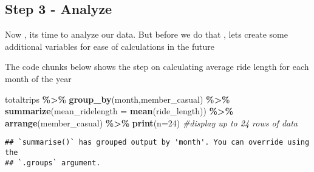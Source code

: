 \documentclass[
]{article}
\newenvironment{Shaded}{\begin{snugshade}}{\end{snugshade}}
\newcommand{\AttributeTok}[1]{\textcolor[rgb]{0.13,0.29,0.53}{#1}}
\newcommand{\CommentTok}[1]{\textcolor[rgb]{0.56,0.35,0.01}{\textit{#1}}}
\newcommand{\DecValTok}[1]{\textcolor[rgb]{0.00,0.00,0.81}{#1}}
\newcommand{\FunctionTok}[1]{\textcolor[rgb]{0.13,0.29,0.53}{\textbf{#1}}}
\newcommand{\NormalTok}[1]{#1}
\newcommand{\OtherTok}[1]{\textcolor[rgb]{0.56,0.35,0.01}{#1}}
\newcommand{\SpecialCharTok}[1]{\textcolor[rgb]{0.81,0.36,0.00}{\textbf{#1}}}
\begin{document}
\subsection{Step 3 - Analyze}\label{step-3---analyze}

Now , its time to analyze our data. But before we do that , lets create
some additional variables for ease of calculations in the future

\begin{Shaded}
\end{Shaded}

The code chunks below shows the step on calculating average ride length
for each month of the year

\begin{Shaded}
\begin{Highlighting}[]
\NormalTok{totaltrips }\SpecialCharTok{\%\textgreater{}\%} \FunctionTok{group\_by}\NormalTok{(month,member\_casual) }\SpecialCharTok{\%\textgreater{}\%} \FunctionTok{summarize}\NormalTok{(}\AttributeTok{mean\_ridelength =} \FunctionTok{mean}\NormalTok{(ride\_length)) }\SpecialCharTok{\%\textgreater{}\%} \FunctionTok{arrange}\NormalTok{(member\_casual) }\SpecialCharTok{\%\textgreater{}\%} \FunctionTok{print}\NormalTok{(}\AttributeTok{n=}\DecValTok{24}\NormalTok{) }\CommentTok{\#display up to 24 rows of data}
\end{Highlighting}
\end{Shaded}

\begin{verbatim}
## `summarise()` has grouped output by 'month'. You can override using the
## `.groups` argument.
\end{verbatim}
\end{document}
